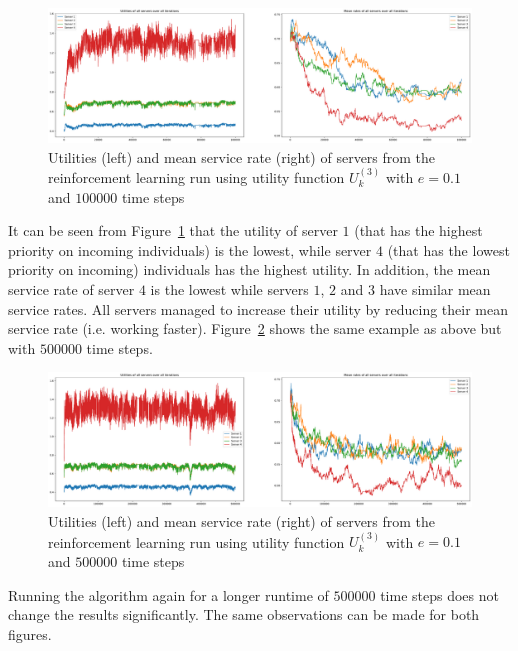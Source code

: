 \begin{figure}[H]
    \includegraphics[width=\textwidth]{chapters/06_agent_based_extension/Bin/reinforcement_learning_results/utility_3/u3_1_e01.pdf}
    \caption{Utilities (left) and mean service rate (right) of servers from the
    reinforcement learning run using utility function \(U_k^{(3)}\) with
    \(e = 0.1\) and \(100000\) time steps}
    \label{fig:RL_utility3_1_e01}
\end{figure}

It can be seen from Figure~\ref{fig:RL_utility3_1_e01} that the utility of
server \(1\) (that has the highest priority on incoming individuals) is the
lowest, while server \(4\) (that has the lowest priority on incoming)
individuals has the highest utility.
In addition, the mean service rate of server \(4\) is the lowest while servers
\(1\), \(2\) and \(3\) have similar mean service rates.
All servers managed to increase their utility by reducing their mean service
rate (i.e. working faster).
Figure~\ref{fig:RL_utility3_2_e01} shows the same example as above but with
\(500000\) time steps.

\begin{figure}[H]
    \includegraphics[width=\textwidth]{chapters/06_agent_based_extension/Bin/reinforcement_learning_results/utility_3/u3_2_e01.pdf}
    \caption{Utilities (left) and mean service rate (right) of servers from the
    reinforcement learning run using utility function \(U_k^{(3)}\) with
    \(e = 0.1\) and \(500000\) time steps}
    \label{fig:RL_utility3_2_e01}
\end{figure}

Running the algorithm again for a longer runtime of \(500000\) time steps
does not change the results significantly.
The same observations can be made for both figures.




